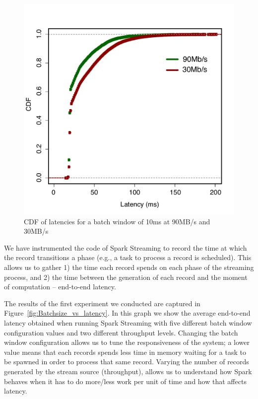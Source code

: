 \begin{figure}[t!]
  \begin{center}
    \includegraphics[scale=0.40]{images_graphs/cdf_latencies/cdf_e2e_times.pdf}
  \end{center}
  \caption{CDF of latencies for a batch window of 10ms at 90MB/s and 30MB/s}
  \label{fig:CDF_latencies}
\end{figure}

We have instrumented the code of Spark Streaming to record the time at which the record transitions a phase (e.g., a task to process a record is scheduled).
This allows us to gather 1) the time each record spends on each phase of the streaming process, and 2) the time between the generation of each record and the moment of computation -- end-to-end latency.


The results of the first experiment we conducted are captured in Figure~\ref{fig:Batchsize_vs_latency}.
In this graph we show the average end-to-end latency obtained when running Spark Streaming with five different batch window configuration values and two different throughput levels.
Changing the batch window configuration allows us to tune the responsiveness of the system;
a lower value means that each records spends less time in memory waiting for a task to be spawned in order to process that same record. 
Varying the number of records generated by the stream source (throughput), allows us to understand how 
Spark behaves when it has to do more/less work per unit of time and how that affects latency.

